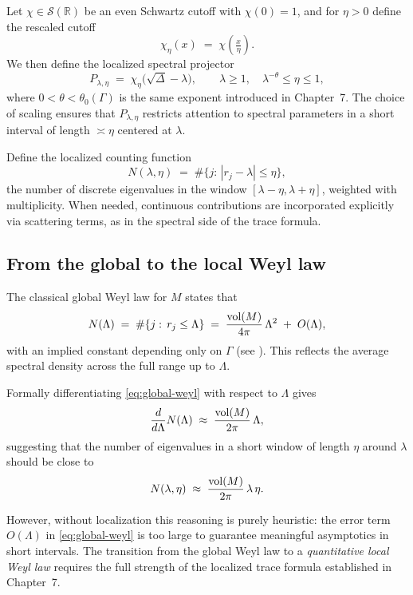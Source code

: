 Let $\chi\in\mathcal{S}(\mathbb{R})$ be an even Schwartz cutoff with $\chi(0)=1$, and for $\eta>0$ define the rescaled cutoff
\[
\chi_\eta(x) \;=\; \chi\!\left(\tfrac{x}{\eta}\right).
\]
We then define the localized spectral projector
\begin{equation}\label{eq:proj-def}
P_{\lambda,\eta} \;=\; \chi_\eta\!\big(\sqrt{\Delta}-\lambda\big),
\qquad \lambda\ge 1,\quad \lambda^{-\theta}\le \eta\le 1,
\end{equation}
where $0<\theta<\theta_0(\Gamma)$ is the same exponent introduced in Chapter~7. The choice of scaling ensures that $P_{\lambda,\eta}$ restricts attention to spectral parameters in a short interval of length $\asymp\eta$ centered at $\lambda$.

Define the localized counting function
\begin{equation}\label{eq:N-def}
N(\lambda,\eta)\;=\;\#\big\{j:\, |r_j-\lambda|\le \eta\big\},
\end{equation}
the number of discrete eigenvalues in the window $[\lambda-\eta,\lambda+\eta]$, weighted with multiplicity. When needed, continuous contributions are incorporated explicitly via scattering terms, as in the spectral side of the trace formula.

\subsection{From the global to the local Weyl law}

The classical global Weyl law for $M$ states that
\begin{equation}\label{eq:global-weyl}
N(\Lambda)\;=\;\#\{j:\, r_j\le \Lambda\}
\;=\;\frac{\operatorname{vol}(M)}{4\pi}\,\Lambda^{2} \;+\; O(\Lambda),
\end{equation}
with an implied constant depending only on $\Gamma$ (see \cite{Selberg1956, DG1975, Hejhal1983, Iwaniec2002}). This reflects the average spectral density across the full range up to $\Lambda$.

Formally differentiating \eqref{eq:global-weyl} with respect to $\Lambda$ gives
\[
\frac{d}{d\Lambda}N(\Lambda)\;\approx\;\frac{\operatorname{vol}(M)}{2\pi}\,\Lambda,
\]
suggesting that the number of eigenvalues in a short window of length $\eta$ around $\lambda$ should be close to
\[
N(\lambda,\eta)\;\approx\;\frac{\operatorname{vol}(M)}{2\pi}\,\lambda\,\eta.
\]

However, without localization this reasoning is purely heuristic: the error term $O(\Lambda)$ in \eqref{eq:global-weyl} is too large to guarantee meaningful asymptotics in short intervals. The transition from the global Weyl law to a \emph{quantitative local Weyl law} requires the full strength of the localized trace formula established in Chapter~7.

